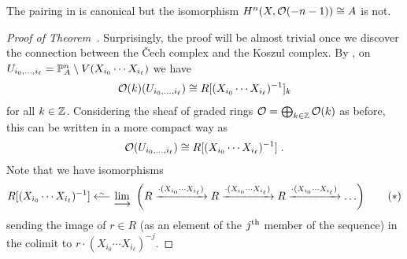 \documentclass[a4paper,parskip=half,numbers=enddot, DIV=12]{scrreprt}
\newcommand{\vC}{\v{C}}
\begin{document}
\begin{rem*}
	The pairing in  is canonical but the isomorphism $H^n(X,\mathcal{O}(-n-1))\cong A$ is not.
\end{rem*}
\begin{proof}[Proof of Theorem~]
	Surprisingly, the proof will be almost trivial once we discover the connection between the \vC ech complex and the Koszul complex. By , on $U_{i_0,\ldots,i_\ell}= \mathbb{P}_A^n\setminus V(X_{i_0}\cdots X_{i_\ell})$ we have
	\begin{align*}
		\mathcal{O}(k)(U_{i_0,\ldots,i_\ell})\cong R[(X_{i_0}\cdots X_{i_\ell})^{-1}]_k
	\end{align*}
	for all $k\in \mathbb{Z}$. Considering the sheaf of graded rings $\mathcal{O}=\bigoplus_{k\in\mathbb{Z}}\mathcal{O}(k)$ as before, this can be written in a more compact way as
	\begin{align*}
		\mathcal{O}(U_{i_0,\ldots,i_\ell})\cong R[(X_{i_0}\cdots X_{i_\ell})^{-1}]\;.
	\end{align*}
	Note that we have isomorphisms
	\begin{align}\lbl{eq:CechKoszulIso1}
			R[(X_{i_0}\cdots X_{i_\ell})^{-1}]\lisomorphism \colimit \left(R\xrightarrow{\cdot(X_{i_0}\cdots X_{i_\ell})}R\xrightarrow{\cdot(X_{i_0}\cdots X_{i_\ell})}R\xrightarrow{\cdot(X_{i_0}\cdots X_{i_\ell})}\ldots\right)\tag{$*$}
	\end{align}
	sending the image of $r\in R$ (as an element of the $j^{\text{th}}$ member of the sequence) in the colimit to $r\cdot (X_{i_0}\cdots X_{i_\ell})^{-j}$.
	

\end{proof}
\end{document}
